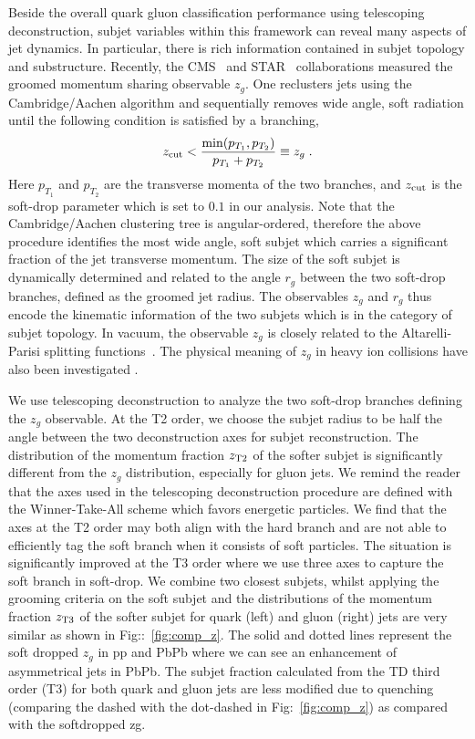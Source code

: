 \documentclass[notoc]{JHEP3}
\begin{document}
Beside the overall quark gluon classification performance using telescoping deconstruction, subjet variables within this framework can reveal many aspects of jet dynamics. In particular, there is rich information contained in subjet topology and substructure. Recently, the CMS~\cite{} and STAR~\cite{} collaborations measured the groomed momentum sharing observable $z_g$. One reclusters jets using the Cambridge/Aachen algorithm \cite{Dokshitzer:1997in,Wobisch:1998wt} and sequentially removes wide angle, soft radiation until the following condition is satisfied by a branching,
\begin{equation}
    z_{\rm cut} < \frac{\min(p_{T_1},p_{T_2})}{p_{T_1}+p_{T_2}} \equiv z_g\;.
    \label{SD}
\end{equation}
Here $p_{T_1}$ and $p_{T_2}$ are the transverse momenta of the two branches, and $z_{\rm cut}$ is the soft-drop parameter which is set to $0.1$ in our analysis. Note that the Cambridge/Aachen clustering tree is angular-ordered, therefore the above procedure identifies the most wide angle, soft subjet which carries a significant fraction of the jet transverse momentum. The size of the soft subjet is dynamically determined and related to the angle $r_g$ between the two soft-drop branches, defined as the groomed jet radius. The observables $z_g$ and $r_g$ thus encode the kinematic information of the two subjets which is in the category of subjet topology. In vacuum, the observable $z_g$ is closely related to the Altarelli-Parisi splitting functions~\cite{Altarelli:1977zs}. The physical meaning of $z_g$ in heavy ion collisions have also been investigated \cite{Chien:2016led}. 

We use telescoping deconstruction to analyze the two soft-drop branches defining the $z_g$ observable. At the T2 order, we choose the subjet radius to be half the angle between the two deconstruction axes for subjet reconstruction. The distribution of the momentum fraction $z_{\rm T2}$ of the softer subjet is significantly different from the $z_g$ distribution, especially for gluon jets. We remind the reader that the axes used in the telescoping deconstruction procedure are defined with the Winner-Take-All scheme which favors energetic particles. We find that the axes at the T2 order may both align with the hard branch and are not able to efficiently tag the soft branch when it consists of soft particles. The situation is significantly improved at the T3 order where we use three axes to capture the soft branch in soft-drop. We combine two closest subjets, whilst applying the grooming criteria on the soft subjet and the distributions of the momentum fraction $z_{\rm T3}$ of the softer subjet for quark (left) and gluon (right) jets are very similar as shown in Fig::~\ref{fig:comp_z}. The solid and dotted lines represent the soft dropped $z_{g}$ in pp and PbPb where we can see an enhancement of asymmetrical jets in PbPb. The subjet fraction calculated from the TD third order (T3) for both quark and gluon jets are less modified due to quenching (comparing the dashed with the dot-dashed in Fig:~\ref{fig:comp_z}) as compared with the softdropped zg. 
\end{document}
